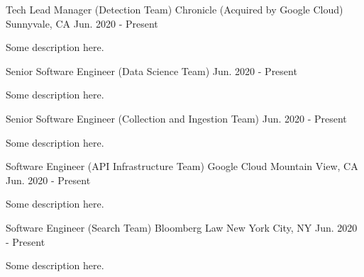 

\begin{cventries}

  \cventry
    {Tech Lead Manager (Detection Team)} %
    {Chronicle (Acquired by Google Cloud)} %
    {Sunnyvale, CA} %
    {Jun. 2020 - Present} %
    {
      \begin{cvitems} %
        \item {Some description here.}
      \end{cvitems}
    }

  \cvminentry
    {Senior Software Engineer (Data Science Team)} %
    {Jun. 2020 - Present} %
    {
      \begin{cvitems} %
        \item {Some description here.}
      \end{cvitems}
    }

  \cvminentry
    {Senior Software Engineer (Collection and Ingestion Team)} %
    {Jun. 2020 - Present} %
    {
      \begin{cvitems} %
        \item {Some description here.}
      \end{cvitems}
    }

  \cventry
    {Software Engineer (API Infrastructure Team)} %
    {Google Cloud} %
    {Mountain View, CA} %
    {Jun. 2020 - Present} %
    {
      \begin{cvitems} %
        \item {Some description here.}
      \end{cvitems}
    }

  \cventry
    {Software Engineer (Search Team)} %
    {Bloomberg Law} %
    {New York City, NY} %
    {Jun. 2020 - Present} %
    {
      \begin{cvitems} %
        \item {Some description here.}
      \end{cvitems}
    }

\end{cventries}
